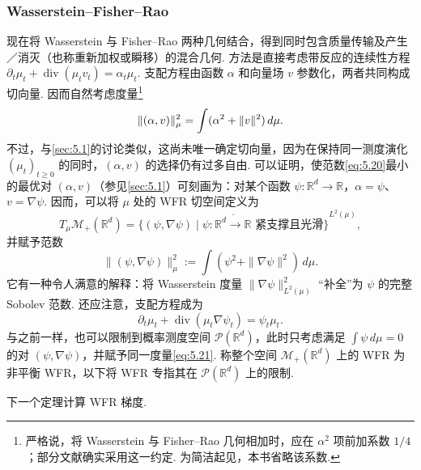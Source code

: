 \subsubsection*{Wasserstein--Fisher--Rao}
现在将 Wasserstein 与 Fisher--Rao 两种几何结合，得到同时包含质量传输及产生／消灭（也称重新加权或瞬移）的混合几何. 方法是直接考虑带反应的连续性方程 $\partial_t\mu_t+\operatorname{div}(\mu_tv_t)=\alpha_t\mu_t$. 支配方程由函数 $\alpha$ 和向量场 $v$ 参数化，两者共同构成切向量. 因而自然考虑度量\footnote{严格说，将 Wasserstein 与 Fisher--Rao 几何相加时，应在 $\alpha^2$ 项前加系数 $1/4$；部分文献确实采用这一约定. 为简洁起见，本书省略该系数.}
\begin{equation}\label{eq:5.20}\index{Wasserstein–Fisher–Rao (WFR)@Wasserstein–Fisher–Rao（WFR）（Wasserstein–Fisher–Rao (WFR)）|hyperpage}
\|(\alpha,v)\|_\mu^2=\int(\alpha^2+\|v\|^2)\,d\mu.
\end{equation}
不过，与\autoref{sec:5.1}的讨论类似，这尚未唯一确定切向量，因为在保持同一测度演化 $(\mu_t)_{t\geq0}$ 的同时，$(\alpha,v)$ 的选择仍有过多自由. 可以证明，使范数\eqref{eq:5.20}最小的最优对 $(\alpha,v)$（参见\autoref{sec:5.1}）可刻画为：对某个函数 $\psi:\mathbb R^d\to\mathbb R$，$\alpha=\psi$、$v=\nabla\psi$. 因而，可以将 $\mu$ 处的 WFR 切空间定义为
$$
T_\mu\mathcal M_+(\mathbb R^d)
=\overline{\{(\psi,\nabla\psi)\mid\psi:\mathbb R^d\to\mathbb R\text{ 紧支撑且光滑}\}}^{L^2(\mu)},
$$
并赋予范数
\begin{equation}\label{eq:5.21}
\|(\psi,\nabla\psi)\|_\mu^2:=\int(\psi^2+\|\nabla\psi\|^2)\,d\mu.
\end{equation}
它有一种令人满意的解释：将 Wasserstein 度量 $\|\nabla\psi\|_{L^2(\mu)}^2$ “补全”为 $\psi$ 的完整 Sobolev 范数. 还应注意，支配方程成为
\begin{equation}\label{eq:5.22}
\partial_t\mu_t+\operatorname{div}(\mu_t\nabla\psi_t)=\psi_t\mu_t.
\end{equation}
与之前一样，也可以限制到概率测度空间 $\mathcal P(\mathbb R^d)$，此时只考虑满足 $\int\psi\,d\mu=0$ 的对 $(\psi,\nabla\psi)$，并赋予同一度量\eqref{eq:5.21}. 称整个空间 $\mathcal M_+(\mathbb R^d)$ 上的 WFR 为非平衡 WFR，以下将 WFR 专指其在 $\mathcal P(\mathbb R^d)$ 上的限制.

下一个定理计算 WFR 梯度.

